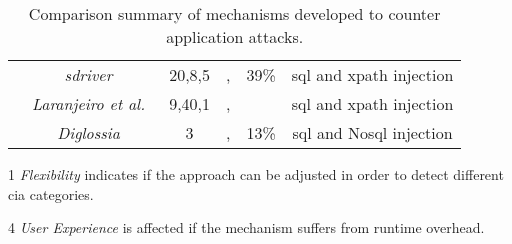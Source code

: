 \documentclass[conference]{IEEEtran}
\newcommand{\tick}{\ding{52}}
\newcommand{\xmark}{\ding{56}}
\begin{document}
\begin{landscape}
\begin{table}
\begin{threeparttable}
\begin{small}
{\begin{tabular}{l|c|c|cc|c}
	& 	{\it {\sc sd}river}~\cite{MS09,MKS09,MKLS11} & 20,8,5 & \tick,\tick & 39\% & {\sc sql} and {\sc xp}ath injection \\
	& 	{\it Laranjeiro et al.}~\cite{LVM09,ALVM09,LVM10} & 9,40,1 & \xmark,\xmark  & \xmark & {\sc sql} and {\sc xp}ath injection \\
	& 	{\it Diglossia}~\cite{SMS13} & 3 & \xmark,\xmark  & 13\% & {\sc sql} and No{\sc sql} injection \\
	\hline
    \end{tabular}}
    \begin{tablenotes}
	\begin{footnotesize}
       \item[1] {\it Flexibility} indicates if the approach can be adjusted
	in order to detect different {\sc cia} categories.
       \item[4] {\it User Experience} is affected if the mechanism suffers
	from runtime overhead.
	\end{footnotesize}
    \end{tablenotes}
    \caption{Comparison summary of mechanisms developed to counter application attacks.}
    \label{tab:comp2}
    \end{small}
    \end{threeparttable}
\end{table}
\end{landscape}
\end{document}
